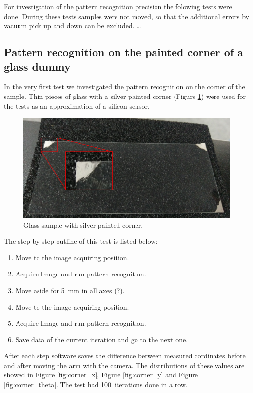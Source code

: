 For investigation of the pattern recognition precision the folowing tests were done. During these tests samples were not moved, so that the additional errors by vacuum pick up and down can be excluded.   \ldots
\subsection{Pattern recognition on the painted corner of a glass dummy}
In the very first test we investigated the pattern recognition on the corner of the sample. Thin pieces of glass with a silver painted corner (Figure \ref{fig:painted_corner}) were used for the tests as an approximation of a silicon sensor.

\begin{figure}[ht]\centering
\includegraphics[width=0.8\linewidth]{Data/Precision_tests/Painted_corner.png}
\caption{Glass sample with silver painted corner.}
\label{fig:painted_corner}
\end{figure}

The step-by-step outline of this test is listed below:
\begin{enumerate}
\item Move to the image acquiring position.
\item Acquire Image and run pattern recognition.
\item Move aside for 5~mm \underline{in all axes (?)}.
\item Move to the image acquiring position.
\item Acquire Image and run pattern recognition.
\item Save data of the current iteration and go to the next one.
\end{enumerate}

After each step software saves the difference between measured cordinates before and after moving the arm with the camera. The distributions of these values are showed in Figure \ref{fig:corner_x}, Figure \ref{fig:corner_y} and Figure \ref{fig:corner_theta}. The test had 100~iterations done in a row.

